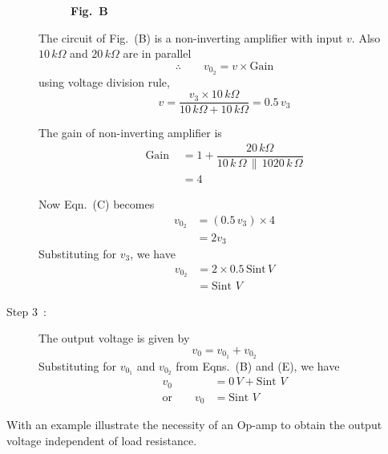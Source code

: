 \begin{solution}
\begin{description}
\begin{figure}[H]
\smallskip
\medskip
{\bf Fig.~B}
\end{figure}

The circuit of Fig.~(B) is a non-inverting amplifier with input $v$. Also $10\,k\Omega$ and $20\,k\Omega$ are in parallel
\begin{equation*}
\therefore\qquad v_{0_{2}}=v\times \text{Gain}\tag{C}
\end{equation*}
using voltage division rule,
\begin{equation*}
v=\dfrac{v_{3}\times 10\,k\Omega}{10\,k\Omega+10\,k\Omega}=0.5\, v_{3}\tag{D}
\end{equation*}

The gain of non-inverting amplifier is
\begin{align*}
\text{Gain~} &= 1+\dfrac{20\,k\Omega}{10\,k\,\Omega\, \|\, 1020\,k\,\Omega}\\[4pt]
&= 4
\end{align*}

Now Eqn.~(C) becomes
\begin{align*}
v_{0_{2}} &= (0.5\,v_{3})\times 4\\[4pt]
&= 2v_{3}
\end{align*}
Substituting for $v_{3}$, we have
\begin{align*}
v_{0_{2}} &= 2\times 0.5\,\text{Sint}\, V\\[4pt]
&= \text{Sint~}V\tag{E}
\end{align*}

\item[Step 3~:] The output voltage is given by
$$
v_{0}=v_{0_{1}}+v_{0_{2}}
$$
Substituting for $v_{0_{1}}$ and $v_{0_{2}}$ from Eqns.~(B) and (E), we have
\begin{align*}
v_{0} &= 0\,V+\text{Sint~}V\\[4pt]
\text{or}\qquad v_{0} &=\text{Sint~}V\tag{F}
\end{align*}
\end{description}
\end{solution}

\begin{example}
With an example illustrate the necessity of an Op-amp to obtain the output voltage independent of load resistance.
\end{example}

